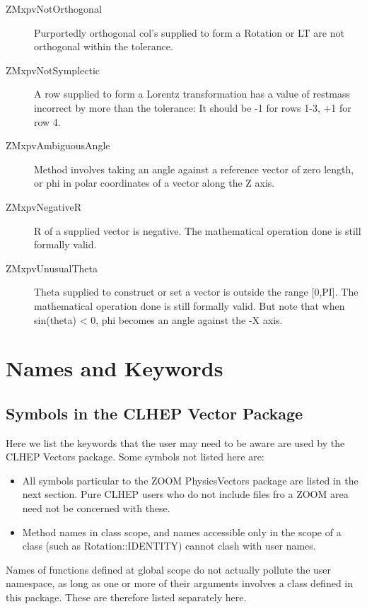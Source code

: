 \begin{description} 
\item [ZMxpvNotOrthogonal]
Purportedly orthogonal col's supplied
to form a Rotation or LT are not
orthogonal within the tolerance.
\item [ZMxpvNotSymplectic]
A row supplied to form a Lorentz
transformation has a value of restmass
incorrect by more than the tolerance:
It should be -1 for rows 1-3,
+1 for row 4.
\item [ZMxpvAmbiguousAngle]
Method involves taking an angle against
a reference vector of zero length, or
phi in polar coordinates of a vector
along the Z axis.
\item [ZMxpvNegativeR]
R of a supplied vector is negative.
The mathematical operation done is
still formally valid.
\item [ZMxpvUnusualTheta]
Theta supplied to construct or set
a vector is outside the range [0,PI].
The mathematical operation done is
still formally valid.  But note that
when sin(theta) < 0, phi becomes an
angle against the -X axis.
\end{description}


\newpage
\section{Names and Keywords}

\subsection {Symbols in the CLHEP Vector Package} 

Here we list the keywords that the user may need to be aware are used by the 
CLHEP Vectors package.  Some symbols not listed here are:

\begin{itemize}
\item
All symbols particular to the ZOOM PhysicsVectors package are listed in 
the next section.  Pure CLHEP users who do not include files fro a ZOOM 
area need not be concerned with these.

\item
Method names in class scope, and names accessible only in the scope of a
class (such as Rotation::IDENTITY) cannot clash with user names.
\end{itemize}

Names of functions defined at global scope do not actually pollute the user
namespace, as long as one or more of their arguments involves a class
defined in this package.  These are therefore listed separately here.

